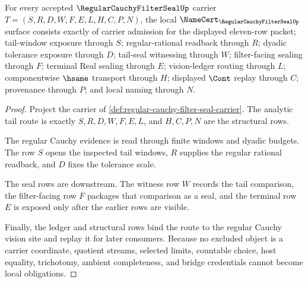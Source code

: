 \begin{theorem}
\label{thm:regular-cauchy-filter-seal-namecert-obligations}
For every accepted $\RegularCauchyFilterSealUp$ carrier $T=(S,R,D,W,F,E,L,H,C,P,N)$, the local $\NameCert_{\RegularCauchyFilterSealUp}$ surface consists exactly of carrier admission for the displayed eleven-row packet; tail-window exposure through $S$; regular-rational readback through $R$; dyadic tolerance exposure through $D$; tail-seal witnessing through $W$; filter-facing sealing through $F$; terminal Real sealing through $E$; vision-ledger routing through $L$; componentwise $\hsame$ transport through $H$; displayed $\Cont$ replay through $C$; provenance through $P$; and local naming through $N$.
\end{theorem}
\begin{proof}
Project the carrier of \autoref{def:regular-cauchy-filter-seal-carrier}. The analytic tail route is exactly $S,R,D,W,F,E,L$, and $H,C,P,N$ are the structural rows.

The regular Cauchy evidence is read through finite windows and dyadic budgets. The row $S$ opens the inspected tail windows, $R$ supplies the regular rational readback, and $D$ fixes the tolerance scale.

The seal rows are downstream. The witness row $W$ records the tail comparison, the filter-facing row $F$ packages that comparison as a seal, and the terminal row $E$ is exposed only after the earlier rows are visible.

Finally, the ledger and structural rows bind the route to the regular Cauchy vision site and replay it for later consumers. Because no excluded object is a carrier coordinate, quotient streams, selected limits, countable choice, host equality, trichotomy, ambient completeness, and bridge credentials cannot become local obligations.
\end{proof}

